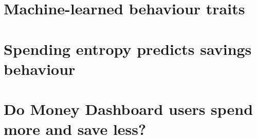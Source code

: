 \documentclass[a4paper, 12pt]{report}
\begin{document}


\tableofcontents

% 
% 
% 

\clearpage
{}



\chapter{Machine-learned behaviour traits}%
\label{cha:mlbt}
% 
% 
% 
% 
% 

\chapter{Spending entropy predicts savings behaviour}%
\label{cha:entropy}
% 
% 
% 
% 
% 
% 

\chapter{Do Money Dashboard users spend more and save less?}%
\label{cha:eval}
% 
% 
% 
% 
% 
% 



\newpage
\printbibliography
{}
\end{document}
